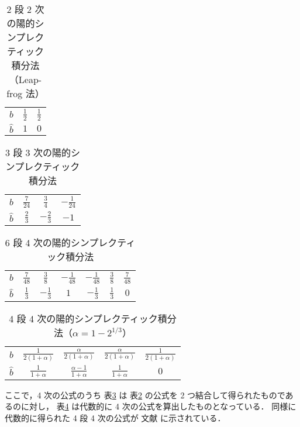 \begin{table}[p]
    \caption{2 段 2 次の陽的シンプレクティック積分法（Leap-frog 法） \cite{Forest1990}}
    \label{table:ode_symplectic_explicit-runge-kutta-2}
    \centering
    \begin{tabular}{c|cc}
        $b$       & $\frac{1}{2}$ & $\frac{1}{2}$ \\
        $\hat{b}$ & $1$           & $0$
    \end{tabular}
\end{table}

\begin{table}[p]
    \caption{3 段 3 次の陽的シンプレクティック積分法 \cite[Section II.16.]{Hairer1993}}
    \label{table:ode_symplectic_explicit-runge-kutta-3}
    \centering
    \begin{tabular}{c|ccc}
        $b$       & $\frac{7}{24}$ & $\frac{3}{4}$  & $-\frac{1}{24}$ \\
        $\hat{b}$ & $\frac{2}{3}$  & $-\frac{2}{3}$ & $-1$
    \end{tabular}
\end{table}

\begin{table}[p]
    \caption{6 段 4 次の陽的シンプレクティック積分法 \cite[Section II.16.]{Hairer1993}}
    \label{table:ode_symplectic_explicit-runge-kutta-4a}
    \centering
    \begin{tabular}{c|cccccc}
        $b$       & $\frac{7}{48}$ & $\frac{3}{8}$  & $-\frac{1}{48}$ & $-\frac{1}{48}$ & $\frac{3}{8}$ & $\frac{7}{48}$ \\
        $\hat{b}$ & $\frac{1}{3}$  & $-\frac{1}{3}$ & $1$             & $-\frac{1}{3}$  & $\frac{1}{3}$ & $0$
    \end{tabular}
\end{table}

\begin{table}[p]
    \caption{4 段 4 次の陽的シンプレクティック積分法（$\alpha = 1 - 2^{1/3}$） \cite{Forest1990}}
    \label{table:ode_symplectic_explicit-runge-kutta-4b}
    \centering
    \begin{tabular}{c|cccc}
        $b$       & $\frac{1}{2(1+\alpha)}$ & $\frac{\alpha}{2(1+\alpha)}$ & $\frac{\alpha}{2(1+\alpha)}$ & $\frac{1}{2(1+\alpha)}$ \\
        $\hat{b}$ & $\frac{1}{1+\alpha}$    & $\frac{\alpha-1}{1+\alpha}$  & $\frac{1}{1+\alpha}$         & $0$
    \end{tabular}
\end{table}

ここで，4 次の公式のうち
表\ref{table:ode_symplectic_explicit-runge-kutta-4a}
は
表\ref{table:ode_symplectic_explicit-runge-kutta-3}
の公式を 2 つ結合して得られたものであるのに対し，
表\ref{table:ode_symplectic_explicit-runge-kutta-4b}
は代数的に 4 次の公式を算出したものとなっている．
同様に代数的に得られた 4 段 4 次の公式が
文献 \cite{Candy1991} に示されている．
